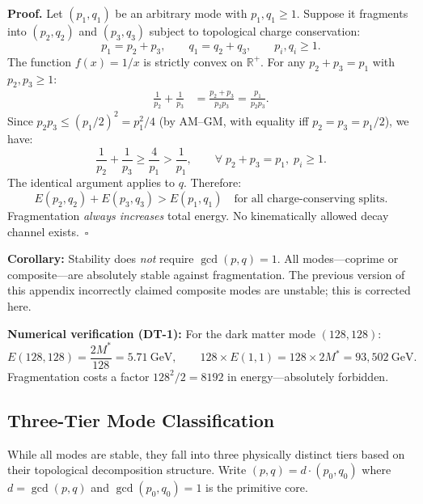 \textbf{Proof.}  Let $(p_1, q_1)$ be an arbitrary mode with $p_1, q_1 \ge 1$.  Suppose it fragments into $(p_2, q_2)$ and $(p_3, q_3)$ subject to topological charge conservation:
\begin{equation}
    p_1 = p_2 + p_3, \qquad q_1 = q_2 + q_3, \qquad p_i, q_i \ge 1.
\end{equation}
The function $f(x) = 1/x$ is strictly convex on $\mathbb{R}^+$.  For any $p_2 + p_3 = p_1$ with $p_2, p_3 \ge 1$:
\begin{align}
    \frac{1}{p_2} + \frac{1}{p_3} &= \frac{p_2 + p_3}{p_2 p_3} = \frac{p_1}{p_2 p_3}. \label{eq:convexity_step}
\end{align}
Since $p_2 p_3 \le (p_1/2)^2 = p_1^2/4$ (by AM--GM, with equality iff $p_2 = p_3 = p_1/2$), we have:
\begin{equation}
    \frac{1}{p_2} + \frac{1}{p_3} \ge \frac{4}{p_1} > \frac{1}{p_1}, \qquad \forall\; p_2 + p_3 = p_1,\; p_i \ge 1.
\end{equation}
The identical argument applies to $q$.  Therefore:
\begin{equation}
    \boxed{E(p_2, q_2) + E(p_3, q_3) > E(p_1, q_1) \quad \text{for all charge-conserving splits.}}
\end{equation}
Fragmentation \emph{always increases} total energy.  No kinematically allowed decay channel exists.~$\square$

\textbf{Corollary:} Stability does \emph{not} require $\gcd(p,q) = 1$.  All modes---coprime or composite---are absolutely stable against fragmentation.  The previous version of this appendix incorrectly claimed composite modes are unstable; this is corrected here.

\textbf{Numerical verification (DT-1):}  For the dark matter mode $(128,128)$:
\begin{equation}
    E(128,128) = \frac{2 M^*}{128} = 5.71~\text{GeV}, \qquad 128 \times E(1,1) = 128 \times 2M^* = 93{,}502~\text{GeV}.
\end{equation}
Fragmentation costs a factor $128^2/2 = 8192$ in energy---absolutely forbidden.

\subsection{Three-Tier Mode Classification}

While all modes are stable, they fall into three physically distinct tiers based on their topological decomposition structure.  Write $(p,q) = d \cdot (p_0, q_0)$ where $d = \gcd(p,q)$ and $\gcd(p_0, q_0) = 1$ is the primitive core.

